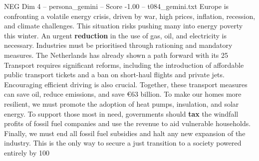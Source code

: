 \begin{textsample}{NEG Dim 4 – persona\_gemini – Score -1.00 – t084\_gemini.txt}  \label{ex:f4_neg_014}
Europe is confronting a volatile energy crisis, driven by war, high prices, inflation, recession, and climate challenges.
This situation risks pushing many into energy poverty this winter.
An urgent \textbf{reduction} in the use of gas, oil, and electricity is necessary.
Industries must be prioritised through rationing and mandatory measures.
The Netherlands has already shown a path forward with its 25 %
Transport requires significant reforms, including the introduction of affordable public transport tickets and a ban on short-haul flights and private jets.
Encouraging efficient driving is also crucial.
Together, these transport measures can save oil, reduce emissions, and save €63 billion.
To make our homes more resilient, we must promote the adoption of heat pumps, insulation, and solar energy.
To support those most in need, governments should \textbf{tax} the windfall profits of fossil fuel companies and use the revenue to aid vulnerable households.
Finally, we must end all fossil fuel subsidies and halt any new expansion of the industry.
This is the only way to secure a just transition to a society powered entirely by 100 %

\end{textsample}
